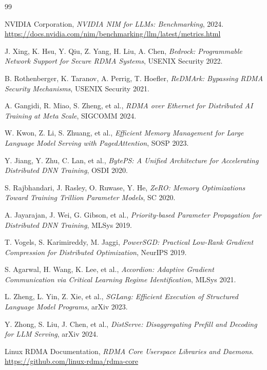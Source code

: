 \documentclass[10pt,letterpaper]{article}
\begin{document}
\newpage

\begin{thebibliography}{99}

NVIDIA Corporation,
\textit{NVIDIA NIM for LLMs: Benchmarking},
2024.
\url{https://docs.nvidia.com/nim/benchmarking/llm/latest/metrics.html}

J. Xing, K. Hsu, Y. Qiu, Z. Yang, H. Liu, A. Chen,
\textit{Bedrock: Programmable Network Support for Secure RDMA Systems},
USENIX Security 2022.

B. Rothenberger, K. Taranov, A. Perrig, T. Hoefler,
\textit{ReDMArk: Bypassing RDMA Security Mechanisms},
USENIX Security 2021.

A. Gangidi, R. Miao, S. Zheng, et al.,
\textit{RDMA over Ethernet for Distributed AI Training at Meta Scale},
SIGCOMM 2024.

W. Kwon, Z. Li, S. Zhuang, et al.,
\textit{Efficient Memory Management for Large Language Model Serving with PagedAttention},
SOSP 2023.

Y. Jiang, Y. Zhu, C. Lan, et al.,
\textit{BytePS: A Unified Architecture for Accelerating Distributed DNN Training},
OSDI 2020.

S. Rajbhandari, J. Rasley, O. Ruwase, Y. He,
\textit{ZeRO: Memory Optimizations Toward Training Trillion Parameter Models},
SC 2020.

A. Jayarajan, J. Wei, G. Gibson, et al.,
\textit{Priority-based Parameter Propagation for Distributed DNN Training},
MLSys 2019.

T. Vogels, S. Karimireddy, M. Jaggi,
\textit{PowerSGD: Practical Low-Rank Gradient Compression for Distributed Optimization},
NeurIPS 2019.

S. Agarwal, H. Wang, K. Lee, et al.,
\textit{Accordion: Adaptive Gradient Communication via Critical Learning Regime Identification},
MLSys 2021.

L. Zheng, L. Yin, Z. Xie, et al.,
\textit{SGLang: Efficient Execution of Structured Language Model Programs},
arXiv 2023.

Y. Zhong, S. Liu, J. Chen, et al.,
\textit{DistServe: Disaggregating Prefill and Decoding for LLM Serving},
arXiv 2024.

Linux RDMA Documentation,
\textit{RDMA Core Userspace Libraries and Daemons}.
\url{https://github.com/linux-rdma/rdma-core}

\end{thebibliography}
\end{document}
